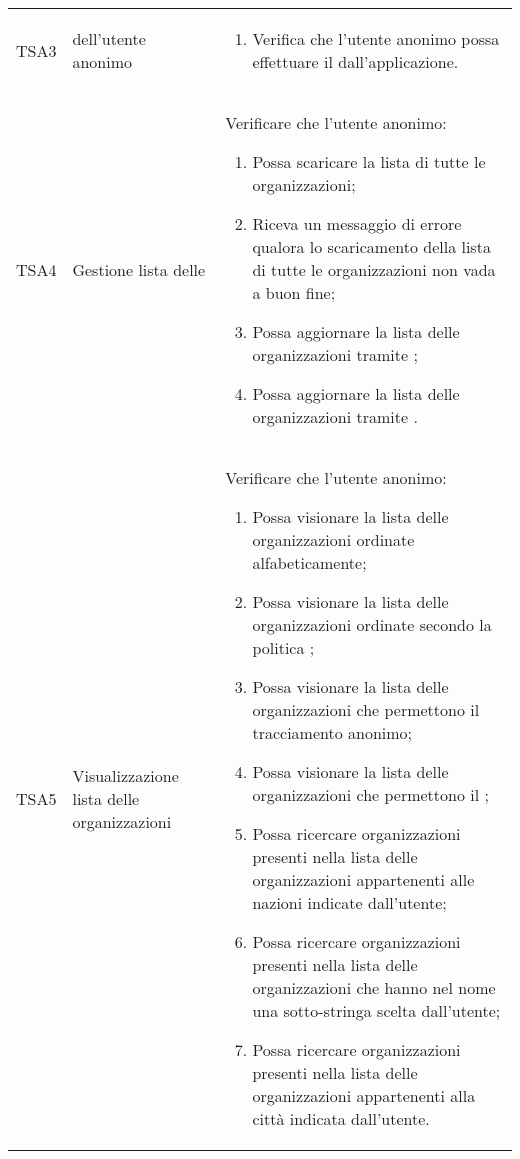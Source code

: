 {\begin{longtable}{ c  C{3cm}  C{11cm} }
TSA3  &  dell'utente anonimo & \begin{enumerate}
    \item Verifica che l'utente anonimo possa effettuare il  dall'applicazione.
\end{enumerate} \\

TSA4 & Gestione lista delle  &
Verificare che l'utente anonimo:
\begin{enumerate}
    \item Possa scaricare la lista di tutte le organizzazioni;
    \item Riceva un messaggio di errore qualora lo scaricamento della lista di tutte le organizzazioni non vada a buon fine;
    \item Possa aggiornare la lista delle organizzazioni tramite ;
    \item Possa aggiornare la lista delle organizzazioni tramite .
\end{enumerate} \\

TSA5 & Visualizzazione lista delle organizzazioni & 
Verificare che l'utente anonimo:
\begin{enumerate}
    \item Possa visionare la lista delle organizzazioni ordinate alfabeticamente;
    \item Possa visionare la lista delle organizzazioni ordinate secondo la politica ;
    \item Possa visionare la lista delle organizzazioni che permettono il tracciamento anonimo;
    \item Possa visionare la lista delle organizzazioni che permettono il ;
    \item Possa ricercare organizzazioni presenti nella lista delle organizzazioni appartenenti alle nazioni indicate dall'utente;
    \item Possa ricercare organizzazioni presenti nella lista delle organizzazioni che hanno nel nome una sotto-stringa scelta dall'utente;
    \item Possa ricercare organizzazioni presenti nella lista delle organizzazioni appartenenti alla città indicata dall'utente.
\end{enumerate} \\


\end{longtable}}
